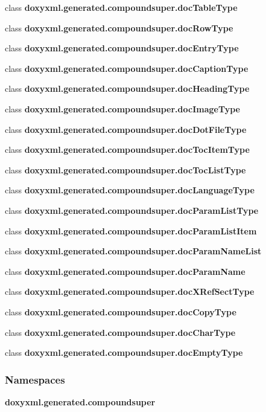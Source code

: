 \begin{DoxyCompactItemize}
\item 
class {\bf doxyxml.\+generated.\+compoundsuper.\+doc\+Table\+Type}
\item 
class {\bf doxyxml.\+generated.\+compoundsuper.\+doc\+Row\+Type}
\item 
class {\bf doxyxml.\+generated.\+compoundsuper.\+doc\+Entry\+Type}
\item 
class {\bf doxyxml.\+generated.\+compoundsuper.\+doc\+Caption\+Type}
\item 
class {\bf doxyxml.\+generated.\+compoundsuper.\+doc\+Heading\+Type}
\item 
class {\bf doxyxml.\+generated.\+compoundsuper.\+doc\+Image\+Type}
\item 
class {\bf doxyxml.\+generated.\+compoundsuper.\+doc\+Dot\+File\+Type}
\item 
class {\bf doxyxml.\+generated.\+compoundsuper.\+doc\+Toc\+Item\+Type}
\item 
class {\bf doxyxml.\+generated.\+compoundsuper.\+doc\+Toc\+List\+Type}
\item 
class {\bf doxyxml.\+generated.\+compoundsuper.\+doc\+Language\+Type}
\item 
class {\bf doxyxml.\+generated.\+compoundsuper.\+doc\+Param\+List\+Type}
\item 
class {\bf doxyxml.\+generated.\+compoundsuper.\+doc\+Param\+List\+Item}
\item 
class {\bf doxyxml.\+generated.\+compoundsuper.\+doc\+Param\+Name\+List}
\item 
class {\bf doxyxml.\+generated.\+compoundsuper.\+doc\+Param\+Name}
\item 
class {\bf doxyxml.\+generated.\+compoundsuper.\+doc\+X\+Ref\+Sect\+Type}
\item 
class {\bf doxyxml.\+generated.\+compoundsuper.\+doc\+Copy\+Type}
\item 
class {\bf doxyxml.\+generated.\+compoundsuper.\+doc\+Char\+Type}
\item 
class {\bf doxyxml.\+generated.\+compoundsuper.\+doc\+Empty\+Type}
\end{DoxyCompactItemize}
\subsubsection*{Namespaces}
\begin{DoxyCompactItemize}
\item 
 {\bf doxyxml.\+generated.\+compoundsuper}
\end{DoxyCompactItemize}
